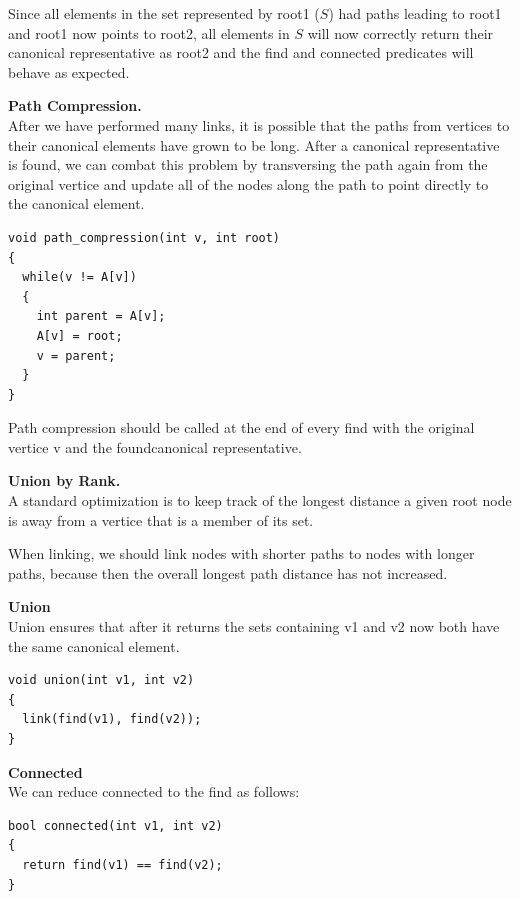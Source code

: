 \documentclass[11pt]{article}
\begin{document}
Since all elements in the set represented by root1 ($S$) had paths leading to root1 and root1 now points to root2, all elements in $S$ will now correctly return their canonical representative as root2 and the find and connected predicates will behave as expected.

\textbf{Path Compression.}\\

After we have performed many links, it is possible that the paths from vertices to their canonical elements have grown to be long. After a canonical representative is found, we can combat this problem by transversing the path again from the original vertice and update all of the nodes along the path to point directly to the canonical element.

\begin{verbatim}
void path_compression(int v, int root)
{
  while(v != A[v])
  {
    int parent = A[v];
    A[v] = root;
    v = parent;
  }
}
\end{verbatim}

Path compression should be called at the end of every find with the original vertice v and the foundcanonical representative.


\textbf{Union by Rank.}\\

A standard optimization is to keep track of the longest distance a given root node is away from a vertice that is a member of its set.

When linking, we should link nodes with shorter paths to nodes with longer paths, because then the overall longest path distance has not increased.

\textbf{Union}\\

Union ensures that after it returns the sets containing v1 and v2 now both have the same canonical element.

\begin{verbatim}
void union(int v1, int v2)
{
  link(find(v1), find(v2));
}
\end{verbatim}


\textbf{Connected}\\

We can reduce connected to the find as follows:\\

\begin{verbatim}
bool connected(int v1, int v2)
{
  return find(v1) == find(v2);
}
\end{verbatim}
\end{document}
